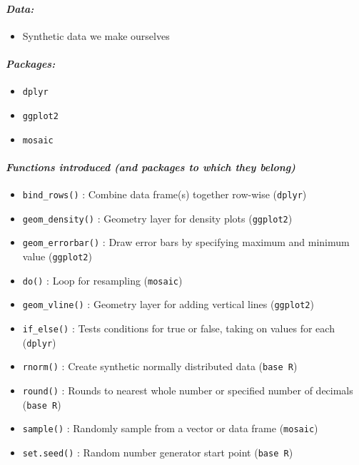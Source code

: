 \documentclass[
]{book}
\providecommand{\tightlist}{%
  \setlength{\itemsep}{0pt}\setlength{\parskip}{0pt}}
\begin{document}
\hypertarget{data-4}{%
\paragraph*{\texorpdfstring{\emph{Data:}}{Data:}}\label{data-4}}

\begin{itemize}
\tightlist
\item
  Synthetic data we make ourselves
\end{itemize}

\hypertarget{packages-5}{%
\paragraph*{\texorpdfstring{\emph{Packages:}}{Packages:}}\label{packages-5}}

\begin{itemize}
\tightlist
\item
  \texttt{dplyr}
\item
  \texttt{ggplot2}
\item
  \texttt{mosaic}
\end{itemize}

\hypertarget{functions-introduced-and-packages-to-which-they-belong-4}{%
\paragraph*{\texorpdfstring{\emph{Functions introduced (and packages to which they belong)}}{Functions introduced (and packages to which they belong)}}\label{functions-introduced-and-packages-to-which-they-belong-4}}

\begin{itemize}
\tightlist
\item
  \texttt{bind\_rows()} : Combine data frame(s) together row-wise (\texttt{dplyr})
\item
  \texttt{geom\_density()} : Geometry layer for density plots (\texttt{ggplot2})
\item
  \texttt{geom\_errorbar()} : Draw error bars by specifying maximum and minimum value (\texttt{ggplot2})
\item
  \texttt{do()} : Loop for resampling (\texttt{mosaic})
\item
  \texttt{geom\_vline()} : Geometry layer for adding vertical lines (\texttt{ggplot2})
\item
  \texttt{if\_else()} : Tests conditions for true or false, taking on values for each (\texttt{dplyr})
\item
  \texttt{rnorm()} : Create synthetic normally distributed data (\texttt{base\ R})
\item
  \texttt{round()} : Rounds to nearest whole number or specified number of decimals (\texttt{base\ R})
\item
  \texttt{sample()} : Randomly sample from a vector or data frame (\texttt{mosaic})
\item
  \texttt{set.seed()} : Random number generator start point (\texttt{base\ R})
\end{itemize}
\end{document}
